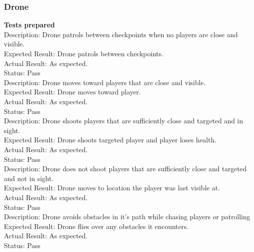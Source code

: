 \documentclass[11pt,a4paper]{article}
\begin{document}
\subsubsection{Drone}
\textbf{Tests prepared}\\
Description: Drone patrols between checkpoints when no players are close and visible.\\
Expected Result: Drone patrols between checkpoints.\\
Actual Result: As expected.\\
Status: Pass
\smallskip\\
Description: Drone moves toward players that are close and visible.\\
Expected Result: Drone moves toward player.\\
Actual Result: As expected.\\
Status: Pass
\smallskip\\
Description: Drone shoots players that are sufficiently close and targeted and in sight.\\
Expected Result: Drone shoots targeted player and player loses health.\\
Actual Result: As expected.\\
Status: Pass
\smallskip\\
Description: Drone does not shoot players that are sufficiently close and targeted and not in sight.\\
Expected Result: Drone moves to location the player was last visible at.\\
Actual Result: As expected.\\
Status: Pass
\smallskip\\
Description: Drone avoids obstacles in it's path while chasing players or patrolling\\
Expected Result: Drone flies over any obstacles it encounters.\\
Actual Result: As expected.\\
Status: Pass
\end{document}
